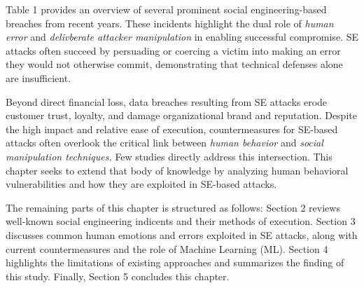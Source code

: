 {Table 1 provides an overview of several prominent social engineering-based breaches from recent years. These incidents highlight the dual role of \textit{human error} and \textit{delivberate attacker manipulation} in enabling successful compromise. SE attacks often succeed by persuading or coercing a victim into making an error they would not otherwise commit, demonstrating that technical defenses alone are insufficient.

Beyond direct financial loss, data breaches resulting from SE attacks erode customer trust, loyalty, and damage organizational brand and reputation. Despite the high impact and relative ease of execution, countermeasures for SE-based attacks often overlook the critical link between \textit{human behavior} and \textit{social manipulation techniques.} Few studies directly address this intersection. This chapter seeks to extend that body of knowledge by analyzing human behavioral vulnerabilities and how they are exploited in SE-based attacks.

The remaining parts of this chapter is structured as follows: Section 2 reviews well-known social engineering indicents and their methods of execution. Section 3 discusses common human emotions and errors exploited in SE attacks, along with current countermeasures and the role of Machine Learning (ML). Section 4 highlights the limitations of existing approaches and summarizes the finding of this study. Finally, Section  5 concludes this chapter.

}
